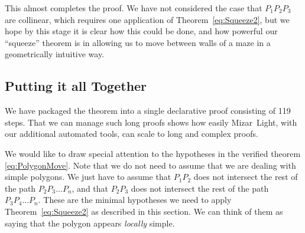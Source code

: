 This almost completes the proof. We have not considered the case that $P_1P_2P_3$ are collinear, which requires one application of Theorem~\ref{eq:Squeeze2}, but we hope by this stage it is clear how this could be done, and how powerful our ``squeeze'' theorem is in allowing us to move between walls of a maze in a geometrically intuitive way.

\subsection{Putting it all Together}
We have packaged the theorem into a single declarative proof consisting of 119 steps. That we can manage such long proofs shows how easily Mizar~Light, with our additional automated tools, can scale to long and complex proofs. 

We would like to draw special attention to the hypotheses in the verified theorem \eqref{eq:PolygonMove}. Note that we do not need to assume that we are dealing with simple polygons. We just have to assume that $P_1P_2$ does not intersect the rest of the path $P_2P_3\ldots P_n$, and that $P_2P_3$ does not intersect the rest of the path $P_3P_4\ldots P_n$. These are the minimal hypotheses we need to apply Theorem~\ref{eq:Squeeze2} as described in this section. We can think of them as saying that the polygon appears \emph{locally} simple.

